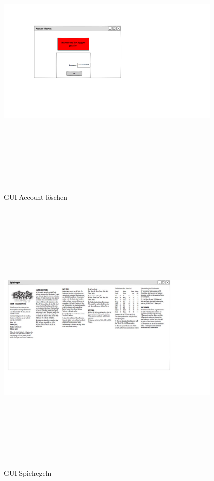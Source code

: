 \begin{center}
	\begin{figure}
		\includegraphics[width=170mm, height =140mm]{PencilProjectData/account_loeschen}
		\caption{GUI Account löschen}
	\end{figure}
	
	\begin{figure}
		\hspace*{-0.5cm}
		\includegraphics[width=170mm, height =140mm]{PencilProjectData/spielregeln}
		\caption{GUI Spielregeln}
	\end{figure}
	

\end{center}

